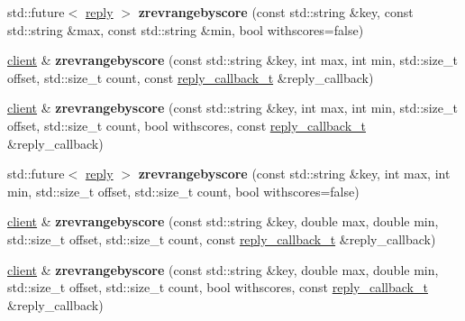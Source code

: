 \begin{DoxyCompactItemize}
std\+::future$<$ \mbox{\hyperlink{classcpp__redis_1_1reply}{reply}} $>$ {\bfseries zrevrangebyscore} (const std\+::string \&key, const std\+::string \&max, const std\+::string \&min, bool withscores=false)
\item 
\mbox{\label{classcpp__redis_1_1client_a1a2eb62d672e005737a60c1e5329588e}} 
\mbox{\hyperlink{classcpp__redis_1_1client}{client}} \& {\bfseries zrevrangebyscore} (const std\+::string \&key, int max, int min, std\+::size\+\_\+t offset, std\+::size\+\_\+t count, const \mbox{\hyperlink{classcpp__redis_1_1client_af7a65eb21aa25230bfbb0b0203c4fc04}{reply\+\_\+callback\+\_\+t}} \&reply\+\_\+callback)
\item 
\mbox{\label{classcpp__redis_1_1client_a388739c16ff65eca8644aa20e352d4b4}} 
\mbox{\hyperlink{classcpp__redis_1_1client}{client}} \& {\bfseries zrevrangebyscore} (const std\+::string \&key, int max, int min, std\+::size\+\_\+t offset, std\+::size\+\_\+t count, bool withscores, const \mbox{\hyperlink{classcpp__redis_1_1client_af7a65eb21aa25230bfbb0b0203c4fc04}{reply\+\_\+callback\+\_\+t}} \&reply\+\_\+callback)
\item 
\mbox{\label{classcpp__redis_1_1client_af946f0c3682a80862d28bf6657ce101b}} 
std\+::future$<$ \mbox{\hyperlink{classcpp__redis_1_1reply}{reply}} $>$ {\bfseries zrevrangebyscore} (const std\+::string \&key, int max, int min, std\+::size\+\_\+t offset, std\+::size\+\_\+t count, bool withscores=false)
\item 
\mbox{\label{classcpp__redis_1_1client_a3c5bf92f09868f24a920778af3a5c1ed}} 
\mbox{\hyperlink{classcpp__redis_1_1client}{client}} \& {\bfseries zrevrangebyscore} (const std\+::string \&key, double max, double min, std\+::size\+\_\+t offset, std\+::size\+\_\+t count, const \mbox{\hyperlink{classcpp__redis_1_1client_af7a65eb21aa25230bfbb0b0203c4fc04}{reply\+\_\+callback\+\_\+t}} \&reply\+\_\+callback)
\item 
\mbox{\label{classcpp__redis_1_1client_aed031357e0c9ed08a898a20bb989860d}} 
\mbox{\hyperlink{classcpp__redis_1_1client}{client}} \& {\bfseries zrevrangebyscore} (const std\+::string \&key, double max, double min, std\+::size\+\_\+t offset, std\+::size\+\_\+t count, bool withscores, const \mbox{\hyperlink{classcpp__redis_1_1client_af7a65eb21aa25230bfbb0b0203c4fc04}{reply\+\_\+callback\+\_\+t}} \&reply\+\_\+callback)

\end{DoxyCompactItemize}
